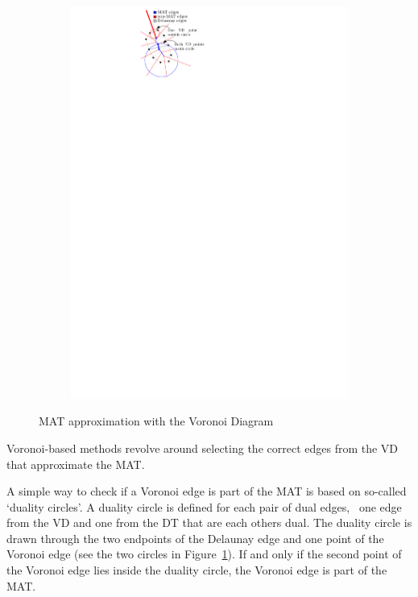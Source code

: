 \begin{figure}[tbp]
\begin{subfigure}{0.39\linewidth}
		\includegraphics[width=\textwidth]{figs/one-step-crust.pdf}
		\label{fig:onestep}
	\end{subfigure}
	\caption{MAT approximation with the Voronoi Diagram}
	\label{fig:voronoi-mat}
\end{figure}
Voronoi-based methods revolve around selecting the correct edges from the VD that approximate the MAT.

A simple way to check if a Voronoi edge is part of the MAT is based on so-called `duality circles'.
A duality circle is defined for each pair of dual edges, \ie\ one edge from the VD and one from the DT that are each others dual. 
The duality circle is drawn through the two endpoints of the Delaunay edge and one point of the Voronoi edge (see the two circles in Figure~\ref{fig:onestep}).
If and only if the second point of the Voronoi edge lies inside the duality circle, the Voronoi edge is part of the MAT.

